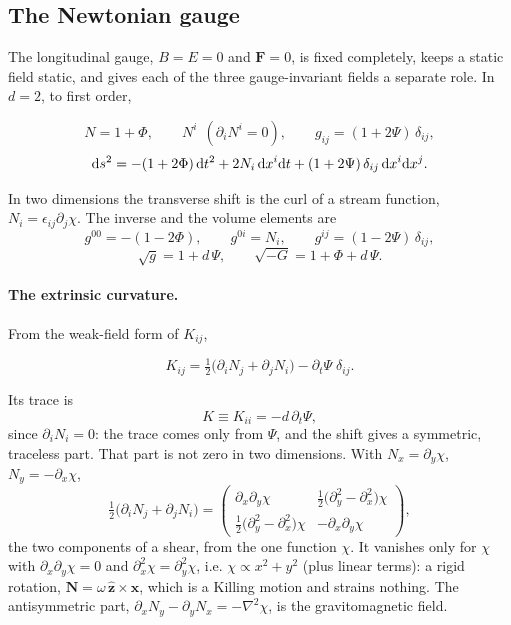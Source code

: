 \documentclass[11pt,aps,preprint,nofootinbib,superscriptaddress,tightenlines]{revtex4-2}
\def\dd{{\rm d}}
\def\st{\begin{equation}}
\def\stp{\end{equation}}
\let\oldparagraph\paragraph
\renewcommand{\paragraph}{\par\bigskip\oldparagraph}
\begin{document}
\subsection{The Newtonian gauge}
\label{app:newtonian}

The longitudinal gauge, $B=E=0$ and $\bm F=0$, is fixed completely, keeps a static field static, and gives each of the three gauge-invariant fields a separate role.
In $d=2$, to first order,
\begin{keyeq}
\st
N=1+\Phi,\qquad N^i\ \ (\partial_iN^i=0),\qquad g_{ij}=(1+2\Psi)\,\delta_{ij},
\stp
\st
\dd s^2=-(1+2\Phi)\,\dd t^2+2N_i\,\dd x^i\dd t+(1+2\Psi)\,\delta_{ij}\,\dd x^i\dd x^j .
\stp
\end{keyeq}
In two dimensions the transverse shift is the curl of a stream function, $N_i=\epsilon_{ij}\partial_j\chi$.  The inverse and the volume elements are
\st
g^{00}=-(1-2\Phi),\qquad g^{0i}=N_i,\qquad g^{ij}=(1-2\Psi)\,\delta_{ij},
\stp
\st
\sqrt g=1+d\,\Psi,\qquad \sqrt{-G}=1+\Phi+d\,\Psi .
\stp

\paragraph{The extrinsic curvature.}  From the weak-field form of $K_{ij}$,
\begin{keyeq}
\st
K_{ij}=\tfrac12\big(\partial_iN_j+\partial_jN_i\big)-\partial_t\Psi\;\delta_{ij} .
\stp
\end{keyeq}
Its trace is
\st
K\equiv K_{ii}=-d\,\partial_t\Psi ,
\stp
since $\partial_iN_i=0$: the trace comes only from $\Psi$, and the shift gives a symmetric, traceless part.  That part is not zero in two dimensions.  With
$N_x=\partial_y\chi$, $N_y=-\partial_x\chi$,
\st
\tfrac12\big(\partial_iN_j+\partial_jN_i\big)=\begin{pmatrix}\partial_x\partial_y\chi & \tfrac12\big(\partial_y^2-\partial_x^2\big)\chi\\[0.5ex]
\tfrac12\big(\partial_y^2-\partial_x^2\big)\chi & -\partial_x\partial_y\chi\end{pmatrix} ,
\stp
the two components of a shear, from the one function $\chi$.  It vanishes only for $\chi$ with $\partial_x\partial_y\chi=0$ and $\partial_x^2\chi=\partial_y^2\chi$, i.e.
$\chi\propto x^2+y^2$ (plus linear terms): a rigid rotation, $\bm N=\omega\,\hat{\bm z}\times\bm x$, which is a Killing motion and strains nothing.  The antisymmetric part,
$\partial_xN_y-\partial_yN_x=-\nabla^2\chi$, is the gravitomagnetic field.
\end{document}
